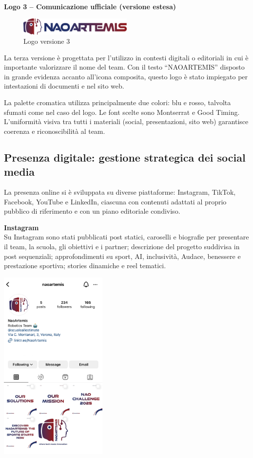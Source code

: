 \documentclass{optica-article}
\begin{document}
\textbf{Logo 3 -- Comunicazione ufficiale (versione estesa)}\\
\begin{figure}[H]
    \centering
    \includegraphics[width=0.5\textwidth]{figures/logo_v3.png}
    \caption{Logo versione 3}
    \label{fig:logo_v3}
\end{figure}
La terza versione \`e progettata per l’utilizzo in contesti digitali o editoriali in cui \`e importante valorizzare il nome del team. Con il testo “NAOARTEMIS” disposto in grande evidenza accanto all’icona composita, questo logo \`e stato impiegato per intestazioni di documenti e nel sito web.

La palette cromatica utilizza principalmente due colori: blu e rosso, talvolta sfumati come nel caso del logo. Le font scelte sono Montserrat e Good Timing. L’uniformit\`a visiva tra tutti i materiali (social, presentazioni, sito web) garantisce coerenza e riconoscibilit\`a al team.

\subsection{Presenza digitale: gestione strategica dei social media}
 La presenza online si \`e sviluppata su diverse piattaforme: Instagram, TikTok, Facebook, YouTube e LinkedIn, ciascuna con contenuti adattati al proprio pubblico di riferimento e con un piano editoriale condiviso.

\textbf{Instagram}\\
Su Instagram sono stati pubblicati post statici, caroselli e biografie per presentare il team, la scuola, gli obiettivi e i partner; descrizione del progetto suddivisa in post sequenziali; approfondimenti su sport, AI, inclusivit\`a, Audace, benessere e prestazione sportiva; stories dinamiche e reel tematici.

\begin{center}
    \includegraphics[width=0.4\textwidth]{figures/instagram.jpg}
\end{center}
\end{document}
